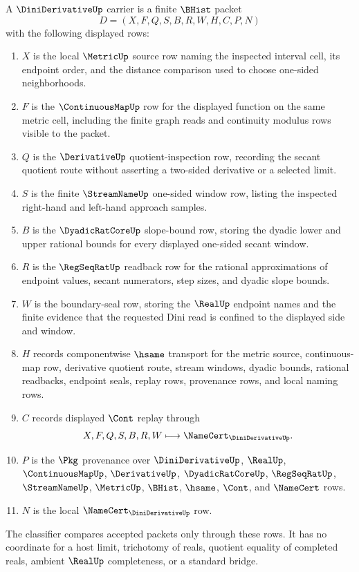 \begin{definition}
\label{def:dini-derivative-carrier}
A $\DiniDerivativeUp$ carrier is a finite $\BHist$ packet
$$
D=(X,F,Q,S,B,R,W,H,C,P,N)
$$
with the following displayed rows:
\begin{enumerate}
\item $X$ is the local $\MetricUp$ source row naming the inspected interval cell, its endpoint order, and the distance comparison used to choose one-sided neighborhoods.
\item $F$ is the $\ContinuousMapUp$ row for the displayed function on the same metric cell, including the finite graph reads and continuity modulus rows visible to the packet.
\item $Q$ is the $\DerivativeUp$ quotient-inspection row, recording the secant quotient route without asserting a two-sided derivative or a selected limit.
\item $S$ is the finite $\StreamNameUp$ one-sided window row, listing the inspected right-hand and left-hand approach samples.
\item $B$ is the $\DyadicRatCoreUp$ slope-bound row, storing the dyadic lower and upper rational bounds for every displayed one-sided secant window.
\item $R$ is the $\RegSeqRatUp$ readback row for the rational approximations of endpoint values, secant numerators, step sizes, and dyadic slope bounds.
\item $W$ is the boundary-seal row, storing the $\RealUp$ endpoint names and the finite evidence that the requested Dini read is confined to the displayed side and window.
\item $H$ records componentwise $\hsame$ transport for the metric source, continuous-map row, derivative quotient route, stream windows, dyadic bounds, rational readbacks, endpoint seals, replay rows, provenance rows, and local naming rows.
\item $C$ records displayed $\Cont$ replay through
$$
X,F,Q,S,B,R,W \longmapsto \NameCert_{\DiniDerivativeUp}.
$$
\item $P$ is the $\Pkg$ provenance over $\DiniDerivativeUp$, $\RealUp$, $\ContinuousMapUp$, $\DerivativeUp$, $\DyadicRatCoreUp$, $\RegSeqRatUp$, $\StreamNameUp$, $\MetricUp$, $\BHist$, $\hsame$, $\Cont$, and $\NameCert$ rows.
\item $N$ is the local $\NameCert_{\DiniDerivativeUp}$ row.
\end{enumerate}
The classifier compares accepted packets only through these rows. It has no coordinate for a host limit, trichotomy of reals, quotient equality of completed reals, ambient $\RealUp$ completeness, or a standard bridge.
\end{definition}

